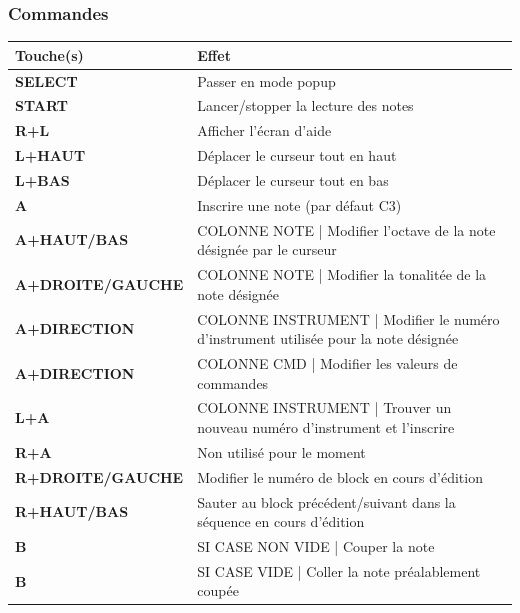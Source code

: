 \documentclass[12pt,a4paper]{article}
\begin{document}
        \subsubsection{Commandes}
        \tablelasttail{\hline}
        \begin{tabular}{|l|p{11cm}|}
        \hline
            \rowcolor{headertab} {\bf Touche(s)} & {\bf Effet} \\
            \hline
            {\bf SELECT} & Passer en mode popup \\
            \hline
            {\bf START} & Lancer/stopper la lecture des notes \\
            \hline
            {\bf R+L} & Afficher l'écran d'aide \\
            \hline
            {\bf L+HAUT} & Déplacer le curseur tout en haut \\
            \hline
            {\bf L+BAS} & Déplacer le curseur tout en bas \\
            \hline
            {\bf A} & Inscrire une note (par défaut C3) \\
            \hline
            {\bf A+HAUT/BAS} & COLONNE NOTE | Modifier l'octave de la note désignée par le curseur \\
            \hline
            {\bf A+DROITE/GAUCHE} & COLONNE NOTE | Modifier la tonalitée de la note désignée \\
            \hline
            {\bf A+DIRECTION} & COLONNE INSTRUMENT | Modifier le numéro d'instrument utilisée pour la note désignée \\
            \hline
            {\bf A+DIRECTION} & COLONNE CMD | Modifier les valeurs de commandes \\
            \hline
            {\bf L+A} & COLONNE INSTRUMENT | Trouver un nouveau numéro d'instrument et l'inscrire \\
            \hline
            {\bf R+A} & Non utilisé pour le moment \\
            \hline
            {\bf R+DROITE/GAUCHE} & Modifier le numéro de block en cours d'édition \\
            \hline
            {\bf R+HAUT/BAS} & Sauter au block précédent/suivant dans la séquence en cours d'édition \\
            \hline
            {\bf B} & SI CASE NON VIDE | Couper la note \\
            \hline
            {\bf B} & SI CASE VIDE | Coller la note préalablement coupée \\
        \hline
        \end{tabular}
    
\end{document}
